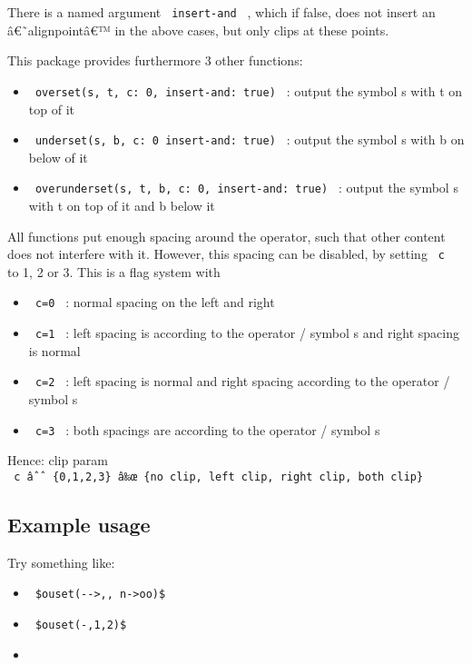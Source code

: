 There is a named argument \texttt{\ insert-and\ } , which if false, does
not insert an â€˜alignpointâ€™ in the above cases, but only clips at
these points.

This package provides furthermore 3 other functions:

\begin{itemize}
\tightlist
\item
  \texttt{\ overset(s,\ t,\ c:\ 0,\ insert-and:\ true)\ } : output the
  symbol s with t on top of it
\item
  \texttt{\ underset(s,\ b,\ c:\ 0\ insert-and:\ true)\ } : output the
  symbol s with b on below of it
\item
  \texttt{\ overunderset(s,\ t,\ b,\ c:\ 0,\ insert-and:\ true)\ } :
  output the symbol s with t on top of it and b below it
\end{itemize}

All functions put enough spacing around the operator, such that other
content does not interfere with it. However, this spacing can be
disabled, by setting \texttt{\ c\ } to 1, 2 or 3. This is a flag system
with

\begin{itemize}
\tightlist
\item
  \texttt{\ c=0\ } : normal spacing on the left and right
\item
  \texttt{\ c=1\ } : left spacing is according to the operator / symbol
  s and right spacing is normal
\item
  \texttt{\ c=2\ } : left spacing is normal and right spacing according
  to the operator / symbol s
\item
  \texttt{\ c=3\ } : both spacings are according to the operator /
  symbol s
\end{itemize}

Hence: clip param
\texttt{\ c\ âˆˆ\ \{0,1,2,3\}\ â‰œ\ \{no\ clip,\ left\ clip,\ right\ clip,\ both\ clip\}\ }

\subsection{Example usage}\label{example-usage}

Try something like:

\begin{itemize}
\item
  \texttt{\ \$ouset(-\/-\textgreater{},,\ n-\textgreater{}oo)\$\ }
\item
  \texttt{\ \$ouset(-,1,2)\$\ }
\item
\begin{Shaded}
\begin{Highlighting}[]

\end{Highlighting}
\end{Shaded}
\end{itemize}

